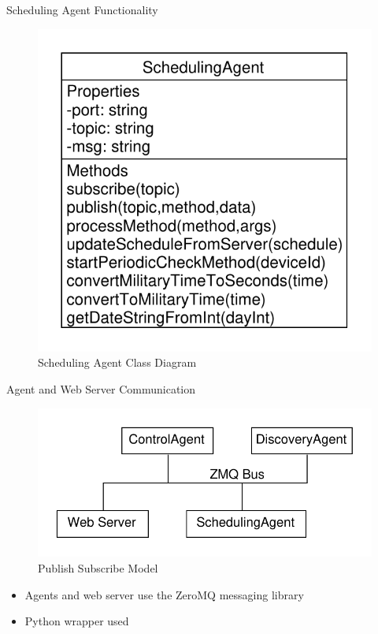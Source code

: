 \documentclass{beamer}
\begin{document}
\begin{frame}{Scheduling Agent Functionality}{}
    \begin{figure}
        \centering
        \includegraphics[scale=0.6]{figs/schedulingAgentUML.pdf}
        \caption{Scheduling Agent Class Diagram}
        \label{fig:schedulingAgentClass}
    \end{figure}
\end{frame}

\begin{frame}{Agent and Web Server Communication}{}
    \begin{figure}
        \centering
        \includegraphics[scale=0.5]{figs/pubSubAgents.pdf}
        \caption{Publish Subscribe Model}
        \label{fig:pubSubModel}
    \end{figure}
    \begin{itemize}
        \item Agents and web server use the ZeroMQ
        messaging library
        \item Python wrapper used
    \end{itemize}
\end{frame}
\end{document}
